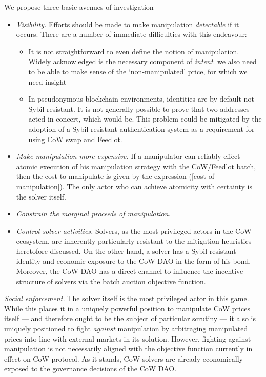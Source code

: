 \documentclass[a4paper,10pt]{article}
\theoremstyle{remark}
\begin{document}
We propose three basic avenues of investigation
\begin{itemize}
  \item
    \emph{Visibility.}
    Efforts should be made to make manipulation \emph{detectable} if it occurs.
    There are a number of immediate difficulties with this endeavour:
    \begin{itemize}
      \item 
        It is not straightforward to even define the notion of manipulation. Widely acknowledged is the necessary component of \emph{intent}. we also need to be able to make sense of the `non-manipulated' price, for which we need insight
      \item 
        In pseudonymous blockchain environments, identities are by default not Sybil-resistant. It is not generally possible to prove that two addresses acted in concert, which would be.
        This problem could be mitigated by the adoption of a Sybil-resistant authentication system as a requirement for using CoW swap and Feedlot.
      \end{itemize}

  \item
    \emph{Make manipulation more expensive.}
    If a manipulator can reliably effect atomic execution of his manipulation strategy with the CoW/Feedlot batch, then the cost to manipulate is given by the expression (\ref{cost-of-manipulation}).
    The only actor who can achieve atomicity with certainty is the solver itself.
    
  \item
    \emph{Constrain the marginal proceeds of manipulation.}
    
    
  \item
    \emph{Control solver activities.}
    Solvers, as the most privileged actors in the CoW ecosystem, are inherently particularly resistant to the mitigation heuristics heretofore discussed.
    On the other hand, a solver has a Sybil-resistant identity and economic exposure to the CoW DAO in the form of his bond.
    Moreover, the CoW DAO has a direct channel to influence the incentive structure of solvers via the batch auction objective function.
  
\end{itemize}

    \emph{Social enforcement.} 
    The solver itself is the most privileged actor in this game. 
    While this places it in a uniquely powerful position to manipulate CoW prices itself --- and therefore ought to be the subject of particular scrutiny --- it also is uniquely positioned to fight \emph{against} manipulation by arbitraging manipulated prices into line with external markets in its solution.
    However, fighting against manipulation is not necessarily aligned with the objective function currently in effect on CoW protocol.
    As it stands, CoW solvers are already economically exposed to the governance decisions of the CoW DAO.
\end{document}
